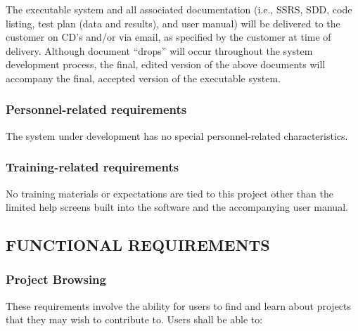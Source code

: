 \documentclass[twoside,letterpaper]{article}
\begin{document}
		The executable system and all associated documentation (i.e., SSRS,
		SDD, code listing, test plan (data and results), and user manual) will
		be delivered to the customer on CD's and/or via email, as specified by
		the customer at time of delivery. Although document ``drops'' will
		occur throughout the system development process, the final, edited
		version of the above documents will accompany the final, accepted
		version of the executable system.
		
	\subsubsection[Personnel{}-related requirements]{\rmfamily\bfseries
		Personnel-related requirements}
		\hypertarget{RefHeading19459017292}{}
		{\color{black}
		The system under development has no special personnel-related characteristics. }
		
	\subsubsection[Training{}-related requirements]{\rmfamily\bfseries\color{black} Training-related
		requirements}
		\hypertarget{RefHeading19659017292}{}
		
		{\color{black}
		No training materials or expectations are tied to this project other than the limited help screens built into the
		software and the accompanying user manual.}
	



\subsection[FUNCTIONAL REQUIREMENTS]{\rmfamily\bfseries FUNCTIONAL REQUIREMENTS}


	\subsubsection{Project Browsing}
	
	These requirements involve the ability for users to find and learn about projects that they may wish to contribute to. Users shall be able to:
	
\end{document}

